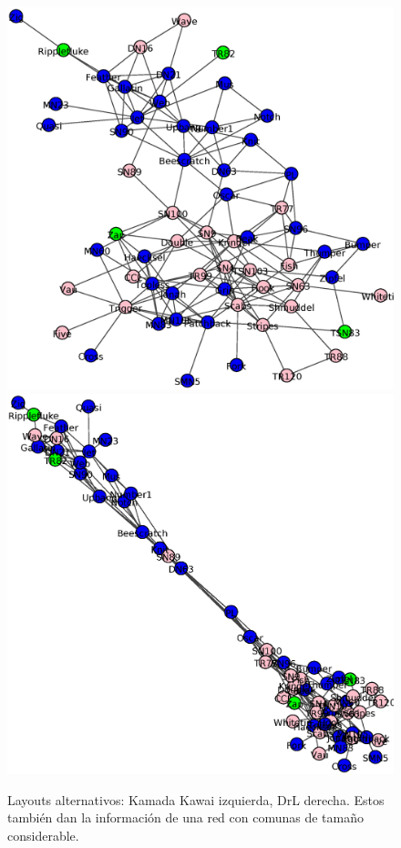 \begin{figure}
\centering
\includegraphics[scale = 0.25]{figuras/KamKaw.eps}
\includegraphics[scale = 0.25]{figuras/Drl.eps}
\caption{Layouts alternativos: Kamada Kawai izquierda, DrL derecha. Estos también dan la información de una red con comunas de tamaño considerable.}
\label{fig:Layout_alternativos}
\end{figure}

